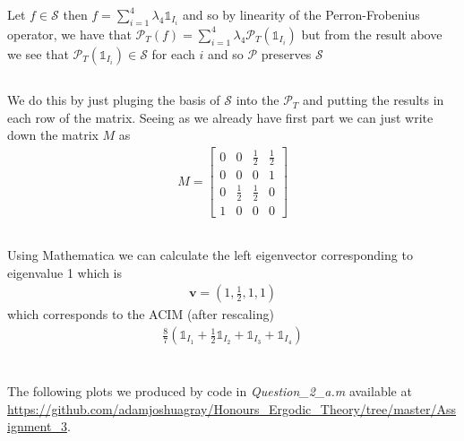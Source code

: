 \documentclass{unswmaths}
\begin{document}
    Let $ f \in \mathcal{S} $ then $ f = \sum_{i=1}^4 \lambda_4 \mathds{1}_{I_i} $ and so by linearity of the Perron-Frobenius operator, we have that $ \mathcal{P}_T(f) = \sum_{i=1}^4 \lambda_4 \mathcal{P}_T(\mathds{1}_{I_i}) $ but from the result above we see that $ \mathcal{P}_T(\mathds{1}_{I_i}) \in \mathcal{S} $ for each $ i $ and so $ \mathcal{P} $ preserves $ \mathcal{S} $
\subsection{}
    We do this by just pluging the basis of $ \mathcal{S} $ into the $ \mathcal{P}_T $ and putting the results in each row of the matrix. Seeing as we already have first part we can just write down the matrix $ M $ as
    \begin{align}
        M = \left[ 
        \begin{array}{cccc}
            0 & 0 & \frac{1}{2} & \frac{1}{2} \\
            0 & 0 & 0 & 1 \\
            0 & \frac{1}{2} & \frac{1}{2} & 0 \\
            1 & 0 & 0 & 0 
        \end{array}
        \right]
    \end{align}
\subsection{}
    Using Mathematica we can calculate the left eigenvector corresponding to eigenvalue 1 which is
    \begin{align}
        \mathbf{v} = (1,\frac{1}{2},1,1)
    \end{align}
    which corresponds to the ACIM (after rescaling)
    \begin{align}
        \frac{8}{7}\left( \mathds{1}_{I_1} + \frac{1}{2}\mathds{1}_{I_2} + \mathds{1}_{I_3} + \mathds{1}_{I_4} \right)
    \end{align}
\clearpage
\section{}
\subsection{}
The following plots we produced by code in \emph{Question\_2\_a.m} available at \url{https://github.com/adamjoshuagray/Honours_Ergodic_Theory/tree/master/Assignment_3}.
\end{document}
